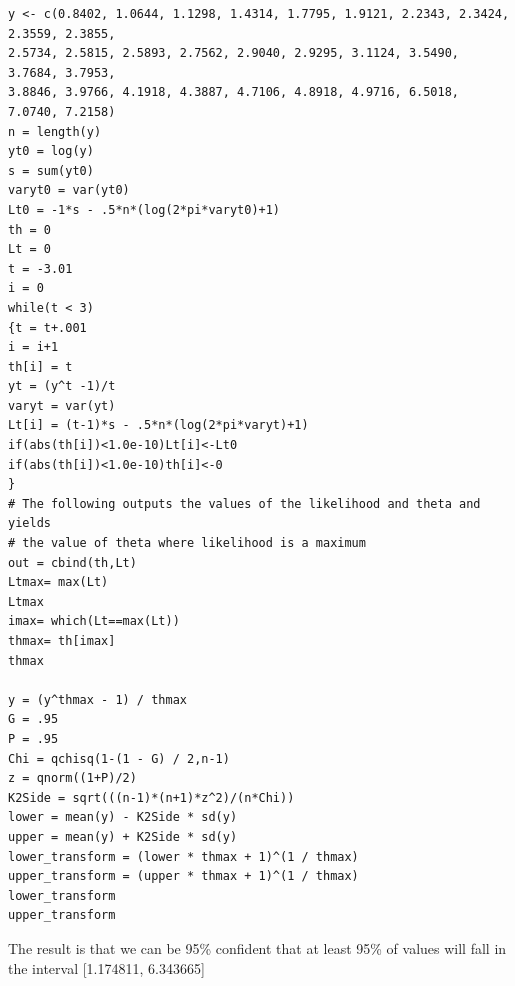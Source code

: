 \documentclass{article}
\begin{document}
\begin{enumerate}
\begin{verbatim}
y <- c(0.8402, 1.0644, 1.1298, 1.4314, 1.7795, 1.9121, 2.2343, 2.3424, 2.3559, 2.3855,
2.5734, 2.5815, 2.5893, 2.7562, 2.9040, 2.9295, 3.1124, 3.5490, 3.7684, 3.7953,
3.8846, 3.9766, 4.1918, 4.3887, 4.7106, 4.8918, 4.9716, 6.5018, 7.0740, 7.2158)
n = length(y)
yt0 = log(y)
s = sum(yt0)
varyt0 = var(yt0)
Lt0 = -1*s - .5*n*(log(2*pi*varyt0)+1)
th = 0
Lt = 0
t = -3.01
i = 0
while(t < 3)
{t = t+.001
i = i+1
th[i] = t
yt = (y^t -1)/t
varyt = var(yt)
Lt[i] = (t-1)*s - .5*n*(log(2*pi*varyt)+1)
if(abs(th[i])<1.0e-10)Lt[i]<-Lt0
if(abs(th[i])<1.0e-10)th[i]<-0
}
# The following outputs the values of the likelihood and theta and yields
# the value of theta where likelihood is a maximum
out = cbind(th,Lt)
Ltmax= max(Lt)
Ltmax
imax= which(Lt==max(Lt))
thmax= th[imax]
thmax

y = (y^thmax - 1) / thmax
G = .95
P = .95
Chi = qchisq(1-(1 - G) / 2,n-1)
z = qnorm((1+P)/2)
K2Side = sqrt(((n-1)*(n+1)*z^2)/(n*Chi))
lower = mean(y) - K2Side * sd(y)
upper = mean(y) + K2Side * sd(y)
lower_transform = (lower * thmax + 1)^(1 / thmax)
upper_transform = (upper * thmax + 1)^(1 / thmax)
lower_transform
upper_transform
\end{verbatim}
The result is that we can be 95\% confident that at least 95\% of values will fall in the interval [1.174811, 6.343665]
\end{enumerate}
\end{document}
